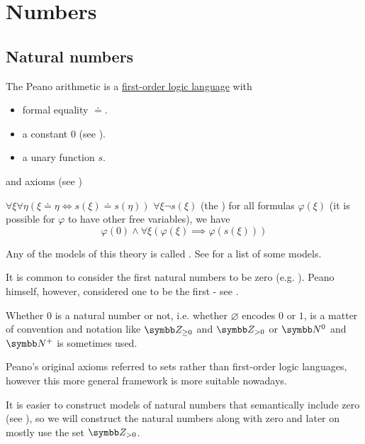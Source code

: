 \section{Numbers}\label{sec:numbers}
\subsection{Natural numbers}\label{subsec:natural_numbers}

\begin{Definition}\label{def:peano_arithmetic}\cite[1]{Peano1889}
  The Peano arithmetic is a \hyperref[def:first_order_logic_language]{first-order logic language} with 
  \begin{itemize}
    \item formal equality \( \doteq \).
    \item a constant \( 0 \) (see ).
    \item a unary function \( s \).
  \end{itemize}
  and axioms (see )
  \begin{DefEnum}
     \( \forall \xi \forall \eta (\xi \doteq \eta \iff s(\xi) \doteq s(\eta)) \)
     \( \forall \xi \neg s(\xi) \)
     (the ) for all formulas \( \varphi(\xi) \) (it is possible for \( \varphi \) to have other free variables), we have
    \begin{equation*}
      \varphi(0) \wedge \forall \xi (\varphi(\xi) \implies \varphi(s(\xi)))
    \end{equation*}
  \end{DefEnum}

  Any of the models of this theory is called . See  for a list of some models.
\end{Definition}

\begin{Remark}\label{remark:peano_arithmetic_zero}
  It is common to consider the first natural numbers to be zero (e.g. \cite[67]{Enderton1977}). Peano himself, however, considered one to be the first - see \cite[1]{Peano1889}.

  Whether \( 0 \) is a natural number or not, i.e. whether \( \varnothing \) encodes \( 0 \) or \( 1 \), is a matter of convention and notation like \( \BZ_{\geq 0} \) and \( \BZ_{>0} \) or \( \BN^0 \) and \( \BN^+ \) is sometimes used.

  Peano's original axioms referred to sets rather than first-order logic languages, however this more general framework is more suitable nowadays.

  It is easier to construct models of natural numbers that semantically include zero (see ), so we will construct the natural numbers along with zero and later on mostly use the set \( \BZ_{>0} \).
\end{Remark}

